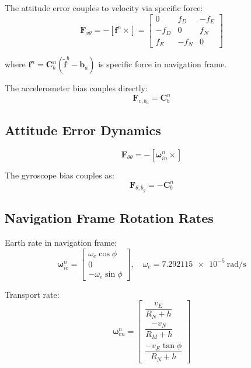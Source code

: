 \documentclass[11pt,a4paper]{article}
\newcommand{\mat}[1]{\mathbf{#1}}
\newcommand{\vect}[1]{\boldsymbol{#1}}
\newcommand{\skewmat}[1]{\left[#1 \times\right]}
\begin{document}
The attitude error couples to velocity via specific force:
\begin{equation}
    \mat{F}_{v\theta} = -\skewmat{\mat{f}^n} = \begin{bmatrix}
        0 & f_D & -f_E \\
        -f_D & 0 & f_N \\
        f_E & -f_N & 0
    \end{bmatrix}
\end{equation}

where $\mat{f}^n = \mat{C}_b^n (\tilde{\mat{f}}^b - \mat{b}_a)$ is specific force in navigation frame.

The accelerometer bias couples directly:
\begin{equation}
    \mat{F}_{v,b_a} = \mat{C}_b^n
\end{equation}

\subsection{Attitude Error Dynamics}

\begin{equation}
    \mat{F}_{\theta\theta} = -\skewmat{\vect{\omega}_{in}^n}
\end{equation}

The gyroscope bias couples as:
\begin{equation}
    \mat{F}_{\theta,b_g} = -\mat{C}_b^n
\end{equation}

\subsection{Navigation Frame Rotation Rates}

Earth rate in navigation frame:
\begin{equation}
    \vect{\omega}_{ie}^n = \begin{bmatrix}
        \omega_e \cos\phi \\ 0 \\ -\omega_e \sin\phi
    \end{bmatrix}, \quad \omega_e = \SI{7.292115e-5}{\radian\per\second}
\end{equation}

Transport rate:
\begin{equation}
    \vect{\omega}_{en}^n = \begin{bmatrix}
        \dfrac{v_E}{R_N + h} \\[1em]
        \dfrac{-v_N}{R_M + h} \\[1em]
        \dfrac{-v_E \tan\phi}{R_N + h}
    \end{bmatrix}
\end{equation}
\end{document}
